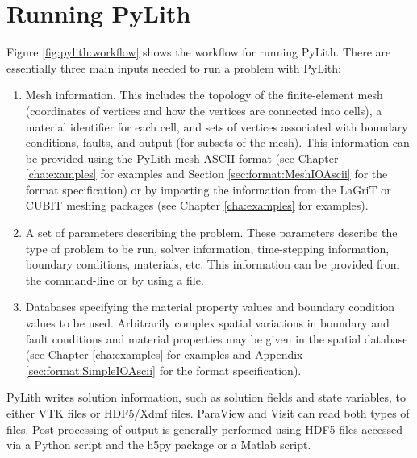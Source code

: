 
\chapter{Running PyLith}

Figure \vref{fig:pylith:workflow} shows the workflow for running PyLith.
There are essentially three main inputs needed to run a problem with
PyLith:
\begin{enumerate}
\item Mesh information. This includes the topology of the
  finite-element mesh (coordinates of vertices and how the vertices
  are connected into cells), a material identifier for each cell, and
  sets of vertices associated with boundary conditions, faults, and
  output (for subsets of the mesh). This information can be provided
  using the PyLith mesh ASCII format (see Chapter \vref{cha:examples}
  for examples and Section \vref{sec:format:MeshIOAscii} for the format
  specification) or by importing the information from the LaGriT or
  CUBIT meshing packages (see Chapter \vref{cha:examples} for
  examples).
\item A set of parameters describing the problem. These parameters
  describe the type of problem to be run, solver information,
  time-stepping information, boundary conditions, materials, etc. This
  information can be provided from the command-line or by using a
   file.
\item Databases specifying the material property values and boundary
  condition values to be used. Arbitrarily complex spatial variations
  in boundary and fault conditions and material properties may be
  given in the spatial database (see Chapter \vref{cha:examples} for
  examples and Appendix \vref{sec:format:SimpleIOAscii} for the
  format specification).
\end{enumerate}
PyLith writes solution information, such as solution fields and state
variables, to either VTK files or HDF5/Xdmf files. ParaView and Visit
can read both types of files. Post-processing of output is generally
performed using HDF5 files accessed via a Python script and the h5py
package or a Matlab script.

